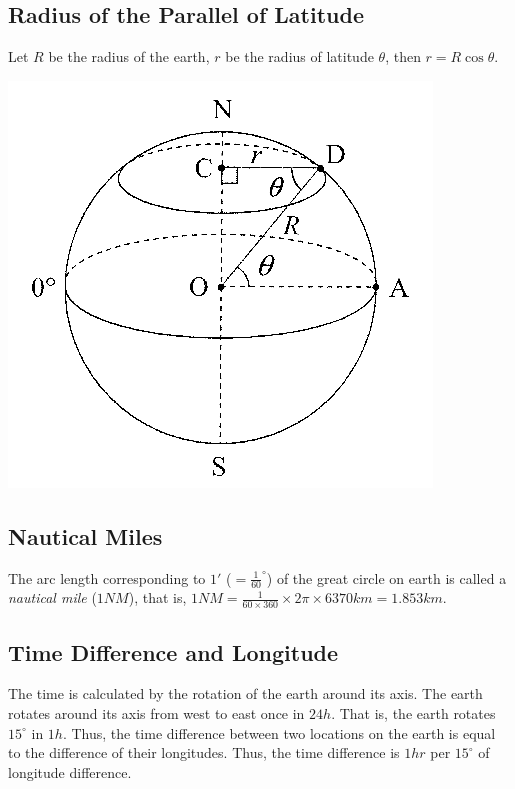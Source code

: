 \documentclass{report}
\begin{document}
\begin{multicols}{2}
    \subsection*{Radius of the Parallel of Latitude}

    Let $R$ be the radius of the earth, $r$ be the radius of latitude $\theta$,
    then $r = R \cos \theta$.
    \begin{center}
        \includegraphics[scale=1.3]{radius of latitude.png}
    \end{center}

    \subsection*{Nautical Miles}

    The arc length corresponding to $1'$ ($=\frac{1}{60}^\circ$) of the great
    circle on earth is called a \emph{nautical mile} ($1NM$), that is, $1NM =
        \frac{1}{60 \times 360} \times 2\pi \times 6370km = 1.853km$.

    \subsection*{Time Difference and Longitude}

    The time is calculated by the rotation of the earth around its axis. The earth
    rotates around its axis from west to east once in $24h$. That is, the earth
    rotates $15^\circ$ in $1h$. Thus, the time difference between two locations on
    the earth is equal to the difference of their longitudes. Thus, the time
    difference is $1hr$ per $15^\circ$ of longitude difference.


\end{multicols}
\end{document}
